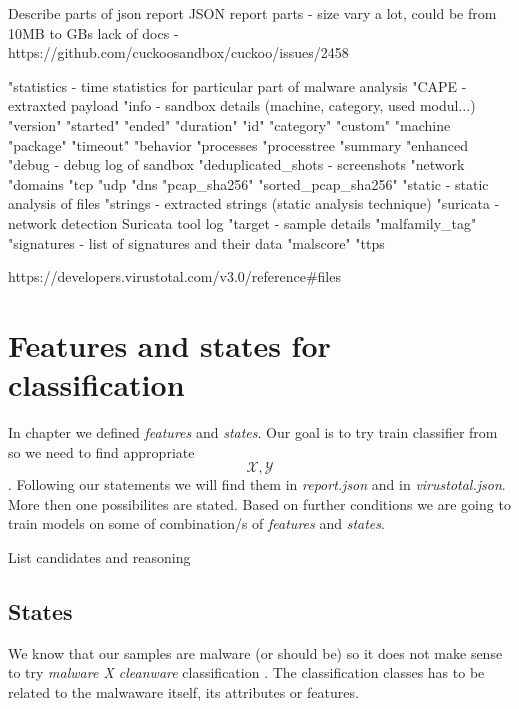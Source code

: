 Describe parts of json report
JSON report parts  
- size vary a lot, could be from 10MB to GBs
lack of docs - https://github.com/cuckoosandbox/cuckoo/issues/2458

"statistics - time statistics for particular part of malware analysis
"CAPE - extraxted payload
"info - sandbox details (machine, category, used modul...)
    "version"
    "started"
    "ended"
    "duration"
    "id"
    "category"
    "custom"
    "machine
    "package"
    "timeout"
"behavior
    "processes
    "processtree
    "summary
    "enhanced
"debug - debug log of sandbox
"deduplicated_shots - screenshots
"network
    "domains
    "tcp
    "udp
    "dns
    "pcap_sha256"
    "sorted_pcap_sha256"
"static - static analysis of files
"strings - extracted strings (static analysis technique)
"suricata - network detection Suricata tool log
"target - sample details
"malfamily_tag"
"signatures - list of signatures and their data
"malscore"
"ttps

https://developers.virustotal.com/v3.0/reference#files


\section{Features and states for classification}
In chapter  we defined \emph{features} and \emph{states}. Our goal  is to try train classifier from so we need to find appropriate $$\mathcal{X}, \mathcal{Y}$$. Following our statements we will find them in \emph{report.json} and in \emph{virustotal.json}. More then one possibilites are stated. Based on further conditions we are going to train models on some of combination/s of \emph{features} and \emph{states}.

List candidates and reasoning

\subsection{States}
We know that our samples are malware (or should be)  so it does not make sense to try \emph{malware X cleanware} classification . The classification classes has to be related to the malwaware itself, its attributes or features.

